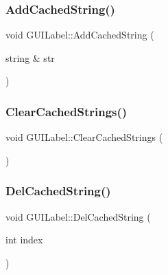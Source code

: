 \hypertarget{class_g_u_i_label_a77943877d13b2feadb46022ad7ef4d74}{}\label{class_g_u_i_label_a77943877d13b2feadb46022ad7ef4d74} 
\subsubsection{\texorpdfstring{Add\+Cached\+String()}{AddCachedString()}}
{\footnotesize\ttfamily void G\+U\+I\+Label\+::\+Add\+Cached\+String (\begin{DoxyParamCaption}\item[{string \&}]{str }\end{DoxyParamCaption})}

\hypertarget{class_g_u_i_label_a2a549c26e59a5b6f9177181325ad2518}{}\label{class_g_u_i_label_a2a549c26e59a5b6f9177181325ad2518} 
\subsubsection{\texorpdfstring{Clear\+Cached\+Strings()}{ClearCachedStrings()}}
{\footnotesize\ttfamily void G\+U\+I\+Label\+::\+Clear\+Cached\+Strings (\begin{DoxyParamCaption}{ }\end{DoxyParamCaption})}

\hypertarget{class_g_u_i_label_aeb3ec4ecdc0c2354a0712232181b7758}{}\label{class_g_u_i_label_aeb3ec4ecdc0c2354a0712232181b7758} 
\subsubsection{\texorpdfstring{Del\+Cached\+String()}{DelCachedString()}}
{\footnotesize\ttfamily void G\+U\+I\+Label\+::\+Del\+Cached\+String (\begin{DoxyParamCaption}\item[{int}]{index }\end{DoxyParamCaption})}

\hypertarget{class_g_u_i_label_a6582906b6f8dd52569f905a797ca52a4}{}\label{class_g_u_i_label_a6582906b6f8dd52569f905a797ca52a4} 

